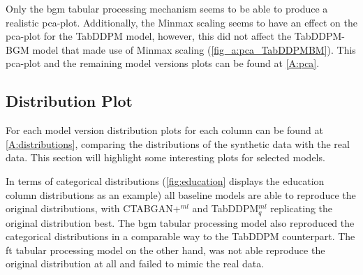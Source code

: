Only the \gls{bgm} tabular processing mechanism seems to be able to produce a realistic \gls{pca}-plot.
Additionally, the Minmax scaling seems to have an effect on the \gls{pca}-plot for the TabDDPM model, however,
this did not affect the TabDDPM-BGM model that made use of Minmax scaling (\autoref{fig_a:pca_TabDDPMBM}).
This \gls{pca}-plot and the remaining model versions plots can be found at \autoref{A:pca}.

\subsection[]{Distribution Plot}
\label{ch:results-Distr}

For each model version distribution plots for each column can be found at \autoref{A:distributions}, comparing the distributions of the synthetic data with the real data.
This section will highlight some interesting plots for selected models.

In terms of categorical distributions (\autoref{fig:education} displays the education column distributions as an example) all baseline models are able to reproduce the original distributions,
with CTABGAN+$^{ml}$ and TabDDPM$^{ml}_q$ replicating the original distribution best.
The \gls{bgm} tabular processing model also reproduced the categorical distributions in a comparable way to the TabDDPM counterpart.
The \gls{ft} tabular processing model on the other hand, was not able reproduce the original distribution at all and failed to mimic the real data.

